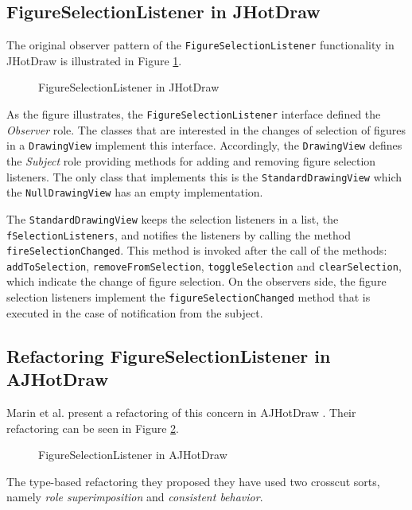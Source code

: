 \subsection{FigureSelectionListener in JHotDraw}
The original observer pattern of the \texttt{FigureSelectionListener} functionality in JHotDraw is illustrated in Figure \ref{fig:JHotDraw_FigureSelectionListener_OOP}.

\begin{figure}[H]
	\centering
  	\caption{FigureSelectionListener in JHotDraw}
  	\label{fig:JHotDraw_FigureSelectionListener_OOP}
\end{figure}

As the figure illustrates, the \texttt{FigureSelectionListener} interface defined the \textit{Observer} role.
The classes that are interested in the changes of selection of figures in a \texttt{DrawingView} implement this interface.
Accordingly, the \texttt{DrawingView} defines the \textit{Subject} role providing methods for adding and removing figure selection listeners.
The only class that implements this is the \texttt{StandardDrawingView} which the \texttt{NullDrawingView} has an empty implementation.

The \texttt{StandardDrawingView} keeps the selection listeners in a list, the \texttt{fSelectionListeners}, and notifies the listeners by calling the method \texttt{fireSelectionChanged}.
This method is invoked after the call of the methods: \texttt{addToSelection}, \texttt{removeFromSelection}, \texttt{toggleSelection} and \texttt{clearSelection}, which indicate the change of figure selection.
On the observers side, the figure selection listeners implement the \texttt{figureSelectionChanged} method that is executed in the case of notification from the subject.

\subsection{Refactoring FigureSelectionListener in AJHotDraw}
Marin et al. present a refactoring of this concern in AJHotDraw \cite{marin2005approach}. 
Their refactoring can be seen in Figure \ref{fig:JHotDraw_FigureSelectionListener_AOP}. 

\begin{figure}[H]
	\centering
  	\caption{FigureSelectionListener in AJHotDraw}
  	\label{fig:JHotDraw_FigureSelectionListener_AOP}
\end{figure}
The type-based refactoring they proposed they have used two crosscut sorts, namely \textit{role superimposition} and \textit{consistent behavior}.

